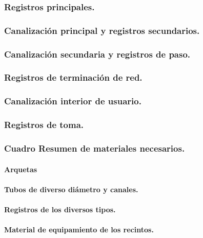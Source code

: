 \subsubsection{Registros principales.}
\subsubsection{Canalización principal y registros secundarios.}
\subsubsection{Canalización secundaria y registros de paso.}
\subsubsection{Registros de terminación de red.}
\subsubsection{Canalización interior de usuario.}
\subsubsection{Registros de toma.}
\subsubsection{Cuadro Resumen de materiales necesarios.}
\paragraph{Arquetas}
\paragraph{Tubos de diverso diámetro y canales.}
\paragraph{Registros de los diversos tipos.}
\paragraph{Material de equipamiento de los recintos.}